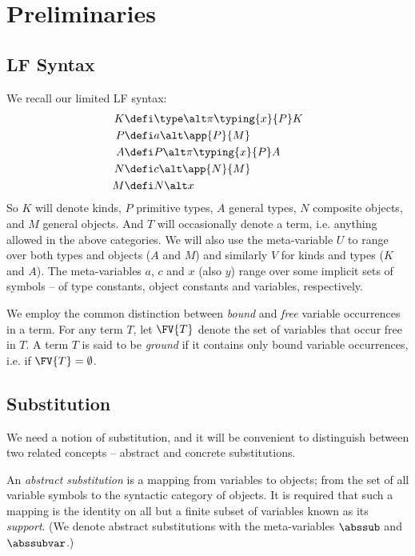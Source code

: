 \clearpage

\section*{Preliminaries}

\subsection*{LF Syntax}

We recall our limited LF syntax:
\begin{align*}
  K &\defi \type \alt \pi{\typing{x}{P}}{K} \\
  P &\defi a \alt \app{P}{M} \\
  A &\defi P \alt \pi{\typing{x}{P}}{A} \\
  N &\defi c \alt \app{N}{M} \\
  M &\defi N \alt x
\end{align*}
So $K$ will denote kinds, $P$ primitive types, $A$ general types, $N$ composite objects, and $M$ general objects.
And $T$ will occasionally denote a term, i.e. anything allowed in the above categories.
We will also use the meta-variable $U$ to range over both types and objects ($A$ and $M$) and similarly $V$ for kinds and types ($K$ and $A$).
The meta-variables $a$, $c$ and $x$ (also $y$) range over some implicit sets of symbols -- of type constants, object constants and variables, respectively.

We employ the common distinction between \emph{bound} and \emph{free} variable occurrences in a term.
For any term $T$, let $\FV{T}$ denote the set of variables that occur free in $T$.
A term $T$ is said to be \emph{ground} if it contains only bound variable occurrences, i.e. if $\FV{T} = \emptyset$.



\subsection*{Substitution}

We need a notion of substitution, and it will be convenient to distinguish between two related concepts -- abstract and concrete substitutions.

\begin{definition}
\label{def:abstract-substitution}
An \emph{abstract substitution} is a mapping from variables to objects; from the set of all variable symbols to the syntactic category of objects.
It is required that such a mapping is the identity on all but a finite subset of variables known as its \emph{support}.
(We denote abstract substitutions with the meta-variables $\abssub$ and $\abssubvar$.)
\end{definition}

